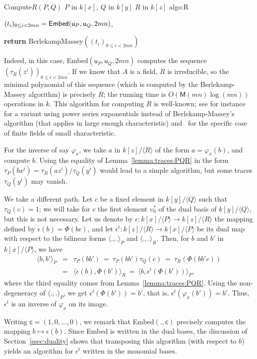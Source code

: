 \documentclass{sig-alternate}
\def\M {\ensuremath{\mathsf{M}}}
\def\vu {\ensuremath{\mathsf{u}}}
\def\vc {\ensuremath{\mathsf{c}}}
\newcounter{algo}
\newenvironment{algorithm_endline}[4]{\small\begin{center}\begin{minipage}{0.48\textwidth}
      \refstepcounter{algo}
      \label{#4}
      \sf
      \rule{\textwidth}{0.2pt}\\
      \makebox[\textwidth][c]{Algorithm~\arabic{algo}:~\textbf{#1}}\\
      \rule[0.5\baselineskip]{\textwidth}{0.2pt}\\

      \vspace{-12pt}

      \parbox{\textwidth}{\textbf{Input} #2}
      \parbox{\textwidth}{\textbf{Output} #3}

\vspace{-7pt}

      \begin{enumerate*}}{\end{enumerate*}
      \vspace{-11pt}
      \rule{\textwidth}{0.2pt}
\end{minipage}\end{center}
}
\newcommand{\ang}[1]{\langle#1\rangle}
\begin{document}
\begin{algorithm_endline}
{Compute$R(P,Q)$}
{$P$ in $k[x]$, $Q$ in $k[y]$}
{$R$ in $k[z]$}
{algo:R}
\item $(t_i)_{0 \le i < 2mn}={\sf Embed}(\vu_P,\vu_Q,2mn)$,
\item {\bf return} BerlekampMassey$((t_i)_{0 \le i < 2mn})$
\end{algorithm_endline}

Indeed, in this case, {\sf Embed}$(\vu_P,\vu_Q,2mn)$ computes the sequence
$(\tau_R(z^i))_{0\le i < 2mn}$. If we know that $A$ is a field, $R$ is
irreducible, so the minimal polynomial of this sequence (which is
computed by the Berlekamp-Massey algorithm) is precisely $R$; the
running time is $O(\M(mn)\log(mn))$ operations in $k$. This algorithm
for computing $R$ is well-known; see for instance~\cite{BoFlSaSc06}
for a variant using power series exponentials instead of
Berlekamp-Massey's algorithm (that applies in large enough
characteristic) and~\cite{BGPS05} for the specific case of finite
fields of small characteristic.


For the inverse of say $\varphi_x$, we take $a$ in $k[z]/\langle R
\rangle$ of the form $a=\varphi_x(b)$, and compute $b$. Using the
equality of Lemma~\ref{lemma:traces:PQR} in the form $\tau_P(b x^i)
=\tau_R(a z^i)/\tau_Q(y^i)$ would lead to a simple algorithm, but some
traces $\tau_Q(y^i)$ may vanish. 

We take a different path. Let $c$ be a fixed element in $k[y]/\ang{Q}$
such that $\tau_Q(c)=1$; we will take for $c$ the first element
$\upsilon^\ast_0$ of the dual basis of $k[y]/\ang{Q}$, but this is not
necessary. Let us denote by $\epsilon: k[x]/\ang{P} \to k[z]/\ang{R}$
the mapping defined by $\epsilon(b) = \Phi(b c)$, and let $\epsilon^t:
k[z]/\ang{R} \to k[x]/\ang{P}$ be its dual map with respect to the
bilinear forms $\ang{.,.}_P$ and $\ang{.,.}_R$. Then, for $b$ and $b'$
in $k[x]/\ang{P}$, we have
\begin{eqnarray*}
  \ang{b,b'}_P &=& \tau_P(b b') ~=~  \tau_P(b b')\tau_Q(c) 
~=~ \tau_R( \Phi(b b' c))\\
&=& \ang{\epsilon(b), \Phi(b')}_R 
~=~ \ang{b, \epsilon^t(\Phi(b'))}_P,
\end{eqnarray*}
where the third equality comes from
Lemma~\ref{lemma:traces:PQR}. Using the non-degeneracy of
$\ang{.,.}_P$, we get $\epsilon^t(\Phi(b')) = b'$, that is,
$\epsilon^t(\varphi_x(b')) = b'$. Thus, $\epsilon^t$ is an inverse of
$\varphi_x$ on its image.

Writing $\vc=(1,0,\dots,0)$, we remark that {\sf Embed}$(.,\vc)$ precisely
computes the mapping $b\mapsto \epsilon(b)$. Since {\sf Embed} is written in
the dual bases, the discussion of Section~\ref{ssec:duality} shows
that transposing this algorithm (with respect to $b$) yields an
algorithm for $\epsilon^t$ written in the monomial bases. 
\end{document}
